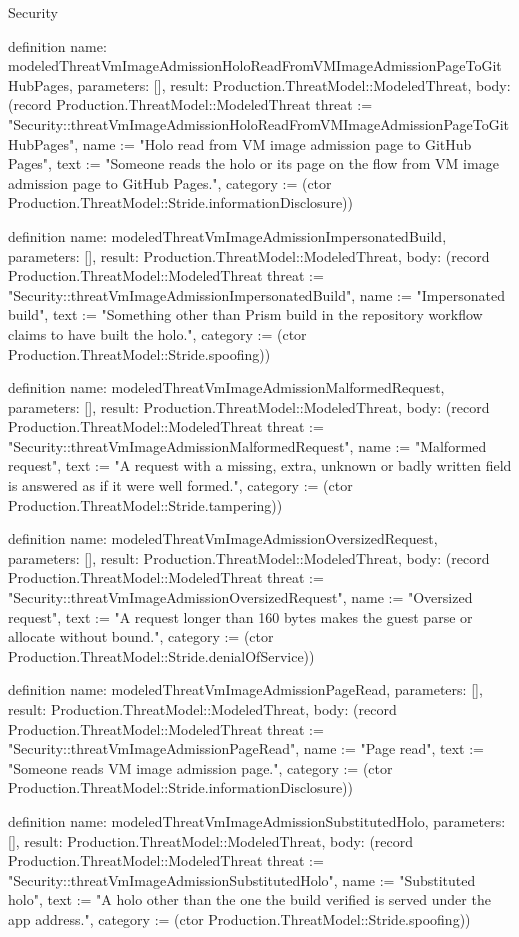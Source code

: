 \begin{lexlean}{Security}
\begin{semanticmodule}
definition{
  name: modeledThreatVmImageAdmissionHoloReadFromVMImageAdmissionPageToGitHubPages,
  parameters: [],
  result: Production.ThreatModel::ModeledThreat,
  body: (record Production.ThreatModel::ModeledThreat {threat := "Security::threatVmImageAdmissionHoloReadFromVMImageAdmissionPageToGitHubPages", name := "Holo read from VM image admission page to GitHub Pages", text := "Someone reads the holo or its page on the flow from VM image admission page to GitHub Pages.", category := (ctor Production.ThreatModel::Stride.informationDisclosure)})
}

definition{
  name: modeledThreatVmImageAdmissionImpersonatedBuild,
  parameters: [],
  result: Production.ThreatModel::ModeledThreat,
  body: (record Production.ThreatModel::ModeledThreat {threat := "Security::threatVmImageAdmissionImpersonatedBuild", name := "Impersonated build", text := "Something other than Prism build in the repository workflow claims to have built the holo.", category := (ctor Production.ThreatModel::Stride.spoofing)})
}

definition{
  name: modeledThreatVmImageAdmissionMalformedRequest,
  parameters: [],
  result: Production.ThreatModel::ModeledThreat,
  body: (record Production.ThreatModel::ModeledThreat {threat := "Security::threatVmImageAdmissionMalformedRequest", name := "Malformed request", text := "A request with a missing, extra, unknown or badly written field is answered as if it were well formed.", category := (ctor Production.ThreatModel::Stride.tampering)})
}

definition{
  name: modeledThreatVmImageAdmissionOversizedRequest,
  parameters: [],
  result: Production.ThreatModel::ModeledThreat,
  body: (record Production.ThreatModel::ModeledThreat {threat := "Security::threatVmImageAdmissionOversizedRequest", name := "Oversized request", text := "A request longer than 160 bytes makes the guest parse or allocate without bound.", category := (ctor Production.ThreatModel::Stride.denialOfService)})
}

definition{
  name: modeledThreatVmImageAdmissionPageRead,
  parameters: [],
  result: Production.ThreatModel::ModeledThreat,
  body: (record Production.ThreatModel::ModeledThreat {threat := "Security::threatVmImageAdmissionPageRead", name := "Page read", text := "Someone reads VM image admission page.", category := (ctor Production.ThreatModel::Stride.informationDisclosure)})
}

definition{
  name: modeledThreatVmImageAdmissionSubstitutedHolo,
  parameters: [],
  result: Production.ThreatModel::ModeledThreat,
  body: (record Production.ThreatModel::ModeledThreat {threat := "Security::threatVmImageAdmissionSubstitutedHolo", name := "Substituted holo", text := "A holo other than the one the build verified is served under the app address.", category := (ctor Production.ThreatModel::Stride.spoofing)})
}


\end{semanticmodule}
\end{lexlean}

